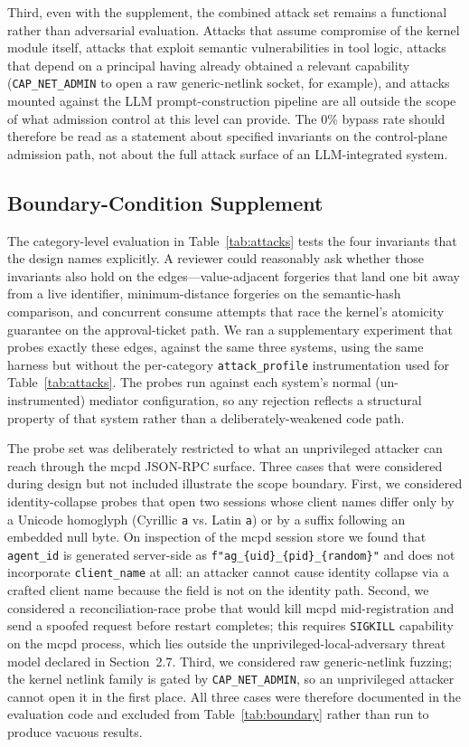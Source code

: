 Third, even with the supplement, the combined attack set remains a functional rather than adversarial evaluation. Attacks that assume compromise of the kernel module itself, attacks that exploit semantic vulnerabilities in tool logic, attacks that depend on a principal having already obtained a relevant capability (\texttt{CAP\_NET\_ADMIN} to open a raw generic-netlink socket, for example), and attacks mounted against the LLM prompt-construction pipeline are all outside the scope of what admission control at this level can provide. The 0\% bypass rate should therefore be read as a statement about specified invariants on the control-plane admission path, not about the full attack surface of an LLM-integrated system.


\subsection{Boundary-Condition Supplement}
\label{sec:boundary-supplement}

The category-level evaluation in Table~\ref{tab:attacks} tests the four invariants that the design names explicitly. A reviewer could reasonably ask whether those invariants also hold on the edges---value-adjacent forgeries that land one bit away from a live identifier, minimum-distance forgeries on the semantic-hash comparison, and concurrent consume attempts that race the kernel's atomicity guarantee on the approval-ticket path. We ran a supplementary experiment that probes exactly these edges, against the same three systems, using the same harness but without the per-category \texttt{attack\_profile} instrumentation used for Table~\ref{tab:attacks}. The probes run against each system's normal (un-instrumented) mediator configuration, so any rejection reflects a structural property of that system rather than a deliberately-weakened code path.

The probe set was deliberately restricted to what an unprivileged attacker can reach through the mcpd JSON-RPC surface. Three cases that were considered during design but not included illustrate the scope boundary. First, we considered identity-collapse probes that open two sessions whose client names differ only by a Unicode homoglyph (Cyrillic \texttt{а} vs. Latin \texttt{a}) or by a suffix following an embedded null byte. On inspection of the mcpd session store we found that \texttt{agent\_id} is generated server-side as \texttt{f"ag\_\{uid\}\_\{pid\}\_\{random\}"} and does not incorporate \texttt{client\_name} at all: an attacker cannot cause identity collapse via a crafted client name because the field is not on the identity path. Second, we considered a reconciliation-race probe that would kill mcpd mid-registration and send a spoofed request before restart completes; this requires \texttt{SIGKILL} capability on the mcpd process, which lies outside the unprivileged-local-adversary threat model declared in Section~2.7. Third, we considered raw generic-netlink fuzzing; the kernel netlink family is gated by \texttt{CAP\_NET\_ADMIN}, so an unprivileged attacker cannot open it in the first place. All three cases were therefore documented in the evaluation code and excluded from Table~\ref{tab:boundary} rather than run to produce vacuous results.

